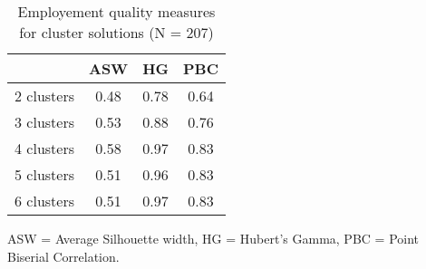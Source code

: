 \begin{table}[htp]
\footnotesize
\setlength{\tabcolsep}{35pt}
\renewcommand{\arraystretch}{1.3}
\begin{threeparttable}
\centering
\caption{Employement quality measures for cluster solutions (N = 207)} 
\label{tab:quality_clusters_job}
\begin{tabular}{lccc}
  \hline
 & ASW & HG & PBC \\ 
  \hline
2 clusters & 0.48 & 0.78 & 0.64 \\ 
  3 clusters & 0.53 & 0.88 & 0.76 \\ 
  4 clusters & 0.58 & 0.97 & 0.83 \\ 
  5 clusters & 0.51 & 0.96 & 0.83 \\ 
  6 clusters & 0.51 & 0.97 & 0.83 \\ 
   \hline
\end{tabular}
\begin{tablenotes}
\scriptsize
\item ASW = Average Silhouette width, HG = Hubert's Gamma, PBC = Point Biserial Correlation.
\end{tablenotes}
\end{threeparttable}
\end{table}
